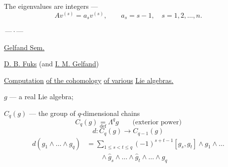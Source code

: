 The eigenvalues are integers ---
\[
Av^{(s)}=a_s v^{(s)},\qquad a_s=s-1,\quad s=1,2,\ldots,n.
\]

\begin{center}\(\text{---}\,\cdot\,\text{---}\)\end{center}



\qquad\underline{Gelfand Sem.}

\underline{D. B. Fuks} (and \underline{I. M. Gelfand})

\underline{Computation} \underline{of the cohomology} \underline{of various} \underline{Lie algebras.}

\(g\) --- a real Lie algebra;

\(C_q(g)\) --- the group of \(q\)-dimensional chains
\[
C_q(g)\underset{\mathrm{def}}{=}\Lambda^q g
\qquad\text{(exterior power)}
\]
\begin{equation}
d:C_q(g)\longrightarrow C_{q-1}(g)\tag{1}
\end{equation}
\begin{equation}
\begin{aligned}
d(g_1\wedge\ldots\wedge g_q)
&=\sum_{1\leq s<t\leq q}(-1)^{s+t-1}
[g_s,g_t]\wedge g_1\wedge\ldots\\
&\qquad\wedge\hat g_s\wedge\ldots\wedge\hat g_t\wedge\ldots\wedge g_q
\end{aligned}\tag*{(1)'}
\end{equation}


